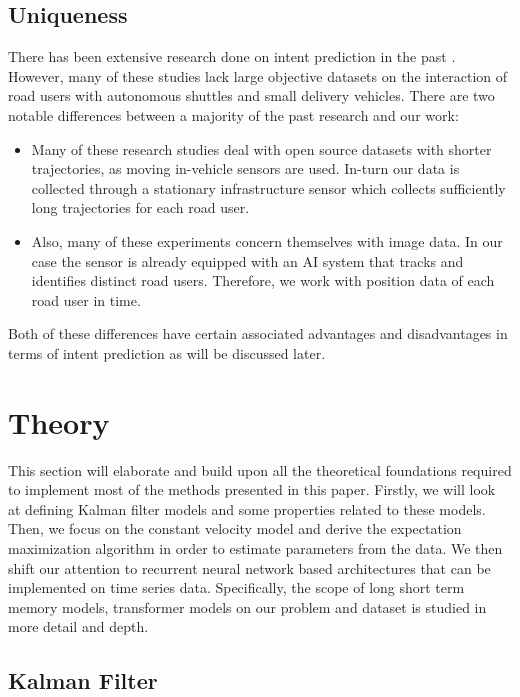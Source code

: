 \documentclass{article}
\begin{document}
\subsection{Uniqueness}
There has been extensive research done on intent prediction in the past \cite{razali_pedestrian_2021}\cite{saleh_early_2017}\cite{alahi_social_2016}\cite{saleh_long-term_2018} . However, many of these studies lack large objective datasets on the interaction of road users with autonomous shuttles and small delivery vehicles. There are two notable differences between a majority of the past research and our work:
\begin{itemize}
    \item Many of these research studies deal with open source datasets with shorter trajectories, as moving in-vehicle sensors are used. In-turn our data is collected through a stationary infrastructure sensor which collects sufficiently long trajectories for each road user. 
    \item Also, many of these experiments concern themselves with image data. In our case the sensor is already equipped with an AI system that tracks and identifies distinct road users. Therefore, we work with position data of each road user in time. 
\end{itemize}
Both of these differences have certain associated advantages and disadvantages in terms of intent prediction as will be discussed later.



\section{Theory}
This section will elaborate and build upon all the theoretical foundations required to implement most of the methods presented in this paper. Firstly, we will look at defining Kalman filter models and some properties related to these models. Then, we focus on the constant velocity model and derive the expectation maximization algorithm in order to estimate parameters from the data. We then shift our attention to recurrent neural network based architectures that can be implemented on time series data. Specifically, the scope of long short term memory models, transformer models on our problem and dataset is studied in more detail and depth. 

\subsection{Kalman Filter}\label{ssec:kf_theory}
\end{document}
